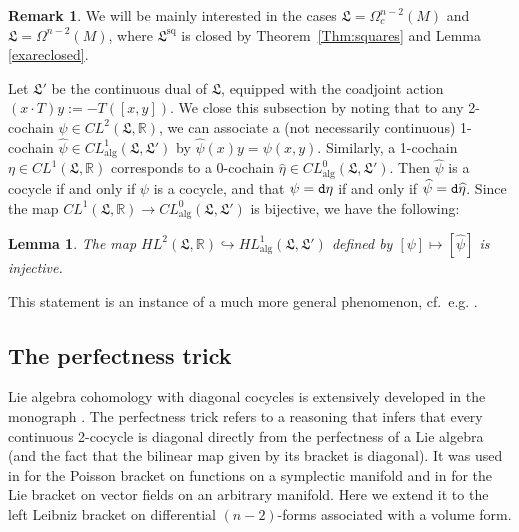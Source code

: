 \documentclass{article}
\newcommand{\sq}{\mathrm{sq}}
\newcommand{\R}{\mathbb{R}}
\newcommand{\dd}{{\tt d}}
\newcommand{\fL}{\mathfrak{L}}
\newtheorem{Lemma}[Theorem]{Lemma}
\theoremstyle{definition}
\newtheorem{Remark}[Theorem]{Remark}
\begin{document}
\begin{Remark}
We will be mainly interested in the cases $\fL = \Omega^{n-2}_{c}(M)$ and $\fL = \Omega^{n-2}(M)$, where 
$\fL^{\sq}$ is closed by Theorem~\ref{Thm:squares} and 
Lemma \ref{exareclosed}.
\end{Remark}

Let $\fL'$ be the continuous dual of $\fL$, equipped with the coadjoint action $(x \cdot T) y := -T([x,y])$.
We close this subsection by noting that to any 2-cochain $\psi\in CL^2(\fL, \R)$, we can associate a (not necessarily continuous) 1-cochain $\widehat{\psi}\in CL_{\mathrm{alg}}^1(\fL,\fL')$ by $\widehat\psi(x)y=\psi(x,y)$. 
Similarly, a 1-cochain $\eta \in CL^1(\fL,\R)$ corresponds to a 0-cochain $\widehat{\eta} \in CL_{\mathrm{alg}}^0(\fL,\fL')$. 
Then $\widehat{\psi}$ is a cocycle if and only if $\psi$ is a cocycle, and that $\psi = \dd \eta$ if and only if 
$\widehat{\psi} = \dd \widehat{\eta}$. Since the map $CL^1(\fL,\R) \rightarrow  CL_{\mathrm{alg}}^0(\fL,\fL')$ is bijective, we have the following:


 
\begin{Lemma}\label{lem:2coc1coc} 
The map $HL^2(\fL,\R) \hookrightarrow HL_{\mathrm{alg}}^1(\fL,\fL')$ defined by $[\psi] \mapsto [\widehat{\psi}]$ is injective.
\end{Lemma}

This statement is an instance of a much more general phenomenon, cf.\ e.g. \cite[Corollary 1.5]{FeldvossWagemann21}.


\subsection{The perfectness trick}

Lie algebra cohomology with diagonal cocycles is extensively developed in the monograph \cite{FuksCohomologyOfInfinite1986}.
The perfectness trick refers to a reasoning that infers that every continuous 2-cocycle is diagonal 
directly from the perfectness of a Lie algebra (and the fact that the bilinear map given by its bracket is diagonal).
It was used in \cite{JV16} for the Poisson bracket on functions on a symplectic manifold
and in \cite{janssensNiestijl2024} for the Lie bracket on vector fields on an arbitrary manifold.
Here we extend it to the left Leibniz bracket on differential $(n-2)$-forms associated with a volume form.
\end{document}
